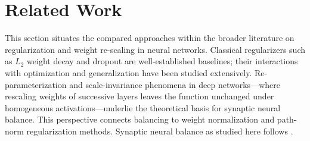 
\section{Related Work}
\label{sec:related-work}

This section situates the compared approaches within the broader literature on regularization and weight re-scaling in neural networks. Classical regularizers such as $L_2$ weight decay \citep{krogh1992simple} and dropout \citep{srivastava2014dropout} are well-established baselines; their interactions with optimization and generalization have been studied extensively. Re-parameterization and scale-invariance phenomena in deep networks---where rescaling weights of successive layers leaves the function unchanged under homogeneous activations---underlie the theoretical basis for synaptic neural balance. This perspective connects balancing to weight normalization and path-norm regularization methods. Synaptic neural balance as studied here follows \citet{alexos2025synapticbalance}.

